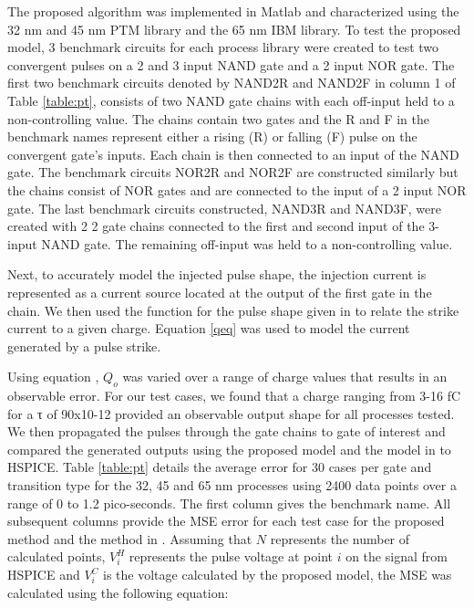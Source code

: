 The proposed algorithm was implemented in Matlab and characterized using the 32 nm and 45 nm PTM library \cite{PTM} and the 65 nm IBM library. To test the proposed model, 3 benchmark circuits for each process library were created to test two convergent pulses on a 2 and 3 input NAND gate and a 2 input NOR gate. The first two benchmark circuits denoted by NAND2R and NAND2F in column 1 of Table \ref{table:pt}, consists of two NAND gate chains with each off-input held to a non-controlling value. The chains contain two gates and the R and F in the benchmark names represent either a rising (R) or falling (F) pulse on the convergent gate’s inputs. Each chain is then connected to an input of the NAND gate. The benchmark circuits NOR2R and NOR2F are constructed similarly but the chains consist of NOR gates and are connected to the input of a 2 input NOR gate. The last benchmark circuits constructed, NAND3R and NAND3F, were created with 2 2 gate chains connected to the first and second input of the 3-input NAND gate. The remaining off-input was held to a non-controlling value. 

Next, to accurately model the injected pulse shape, the injection current is represented as a current source located at the output of the first gate in the chain. We then used the function for the pulse shape given in \cite{injeq} to relate the strike current to a given charge. Equation \ref{qeq} was used to model the current generated by a pulse strike.

Using equation \cite{injeq}, $Q_o$ was varied over a range of charge values that results in an observable error. For our test cases, we found that a charge ranging from 3-16 fC for a τ of 90x10-12 provided an observable output shape for all processes tested. We then propagated the pulses through the gate chains to gate of interest and compared the generated outputs using the proposed model and the model in \cite{Accurate_Masking} to HSPICE. Table \ref{table:pt} details the average error for 30 cases per gate and transition type for the 32, 45 and 65 nm processes using 2400 data points over a range of 0 to 1.2 pico-seconds. The first column gives the benchmark name. All subsequent columns provide the MSE error for each test case for the proposed method and the method in \cite{Accurate_Masking}. Assuming that $N$ represents the number of calculated points, $V_i^H$ represents the pulse voltage at point $i$ on the signal from HSPICE and $V_i^C$ is the voltage calculated by the proposed model, the MSE was calculated using the following equation:

